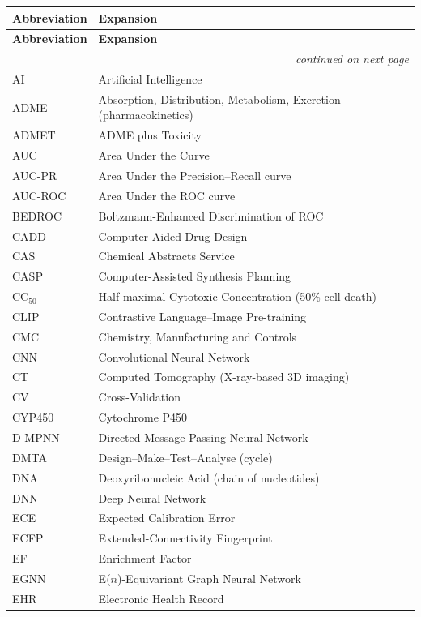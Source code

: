\documentclass[11pt, oneside]{book}
\begin{document}
\begin{longtable}{@{}p{}p{}@{}}
\toprule
\textbf{Abbreviation} & \textbf{Expansion} \\
\midrule
\endfirsthead
\toprule
\textbf{Abbreviation} & \textbf{Expansion} \\
\midrule
\endhead
\midrule
\multicolumn{2}{r}{\footnotesize\itshape continued on next page}\\
\endfoot
\bottomrule
\endlastfoot
AI & Artificial Intelligence \\
ADME & Absorption, Distribution, Metabolism, Excretion (pharmacokinetics) \\
ADMET & ADME plus Toxicity \\
AUC & Area Under the Curve \\
AUC-PR & Area Under the Precision--Recall curve \\
AUC-ROC & Area Under the ROC curve \\
BEDROC & Boltzmann-Enhanced Discrimination of ROC \\
CADD & Computer-Aided Drug Design \\
CAS & Chemical Abstracts Service \\
CASP & Computer-Assisted Synthesis Planning \\
CC$_{50}$ & Half-maximal Cytotoxic Concentration (50\% cell death) \\
CLIP & Contrastive Language--Image Pre-training \\
CMC & Chemistry, Manufacturing and Controls \\
CNN & Convolutional Neural Network \\
CT & Computed Tomography (X-ray-based 3D imaging) \\
CV & Cross-Validation \\
CYP450 & Cytochrome P450 \\
D-MPNN & Directed Message-Passing Neural Network \\
DMTA & Design--Make--Test--Analyse (cycle) \\
DNA & Deoxyribonucleic Acid (chain of nucleotides) \\
DNN & Deep Neural Network \\
ECE & Expected Calibration Error \\
ECFP & Extended-Connectivity Fingerprint \\
EF & Enrichment Factor \\
EGNN & E($n$)-Equivariant Graph Neural Network \\
EHR & Electronic Health Record \\

\end{longtable}
\end{document}
